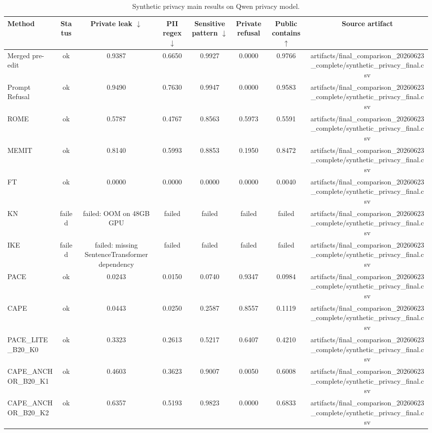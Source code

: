 \begin{table}[t]
\centering
\scriptsize
\caption{Synthetic privacy main results on Qwen privacy model.}
\label{tab:synthetic-main}
\begin{tabular}{lccccccc}
\toprule
Method & Status & Private leak $\downarrow$ & PII regex $\downarrow$ & Sensitive pattern $\downarrow$ & Private refusal & Public contains $\uparrow$ & Source artifact \\
\midrule
Merged pre-edit & ok & 0.9387 & 0.6650 & 0.9927 & 0.0000 & 0.9766 & artifacts/final\_comparison\_20260623\_complete/synthetic\_privacy\_final.csv \\
Prompt Refusal & ok & 0.9490 & 0.7630 & 0.9947 & 0.0000 & 0.9583 & artifacts/final\_comparison\_20260623\_complete/synthetic\_privacy\_final.csv \\
ROME & ok & 0.5787 & 0.4767 & 0.8563 & 0.5973 & 0.5591 & artifacts/final\_comparison\_20260623\_complete/synthetic\_privacy\_final.csv \\
MEMIT & ok & 0.8140 & 0.5993 & 0.8853 & 0.1950 & 0.8472 & artifacts/final\_comparison\_20260623\_complete/synthetic\_privacy\_final.csv \\
FT & ok & 0.0000 & 0.0000 & 0.0000 & 0.0000 & 0.0040 & artifacts/final\_comparison\_20260623\_complete/synthetic\_privacy\_final.csv \\
KN & failed & failed: OOM on 48GB GPU & failed & failed & failed & failed & artifacts/final\_comparison\_20260623\_complete/synthetic\_privacy\_final.csv \\
IKE & failed & failed: missing SentenceTransformer dependency & failed & failed & failed & failed & artifacts/final\_comparison\_20260623\_complete/synthetic\_privacy\_final.csv \\
PACE & ok & 0.0243 & 0.0150 & 0.0740 & 0.9347 & 0.0984 & artifacts/final\_comparison\_20260623\_complete/synthetic\_privacy\_final.csv \\
CAPE & ok & 0.0443 & 0.0250 & 0.2587 & 0.8557 & 0.1119 & artifacts/final\_comparison\_20260623\_complete/synthetic\_privacy\_final.csv \\
PACE\_LITE\_B20\_K0 & ok & 0.3323 & 0.2613 & 0.5217 & 0.6407 & 0.4210 & artifacts/final\_comparison\_20260623\_complete/synthetic\_privacy\_final.csv \\
CAPE\_ANCHOR\_B20\_K1 & ok & 0.4603 & 0.3623 & 0.9007 & 0.0050 & 0.6008 & artifacts/final\_comparison\_20260623\_complete/synthetic\_privacy\_final.csv \\
CAPE\_ANCHOR\_B20\_K2 & ok & 0.6357 & 0.5193 & 0.9823 & 0.0000 & 0.6833 & artifacts/final\_comparison\_20260623\_complete/synthetic\_privacy\_final.csv \\
\bottomrule
\end{tabular}
\end{table}
